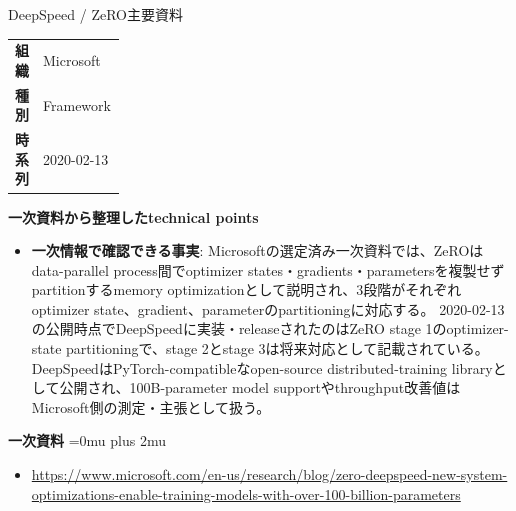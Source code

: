 \begin{technicalnote}{DeepSpeed / ZeRO}{主要資料}
\begingroup
\begin{tabularx}{\linewidth}{@{}>{\bfseries}p{0.22\linewidth}X@{}}
組織 & Microsoft \\
種別 & Framework \\
時系列 & 2020-02-13 \\
\end{tabularx}
\smallskip
{\bfseries 一次資料から整理したtechnical points}
\begin{itemize}[leftmargin=1.5em,itemsep=0.35em]
\item \textbf{一次情報で確認できる事実}: Microsoftの選定済み一次資料では、ZeROはdata-parallel process間でoptimizer states・gradients・parametersを複製せずpartitionするmemory optimizationとして説明され、3段階がそれぞれoptimizer state、gradient、parameterのpartitioningに対応する。 2020-02-13の公開時点でDeepSpeedに実装・releaseされたのはZeRO stage 1のoptimizer-state partitioningで、stage 2とstage 3は将来対応として記載されている。 DeepSpeedはPyTorch-compatibleなopen-source distributed-training libraryとして公開され、100B-parameter model supportやthroughput改善値はMicrosoft側の測定・主張として扱う。
\end{itemize}
\begin{minipage}{\linewidth}
\begin{samepage}
{\bfseries 一次資料}
\begingroup\sloppy
\Urlmuskip=0mu plus 2mu\relax
\begin{itemize}[leftmargin=1.5em,itemsep=0.25em]
\item {\scriptsize\url{https://www.microsoft.com/en-us/research/blog/zero-deepspeed-new-system-optimizations-enable-training-models-with-over-100-billion-parameters}}
\end{itemize}
\endgroup
\end{samepage}
\end{minipage}
\endgroup
\end{technicalnote}
\medskip

